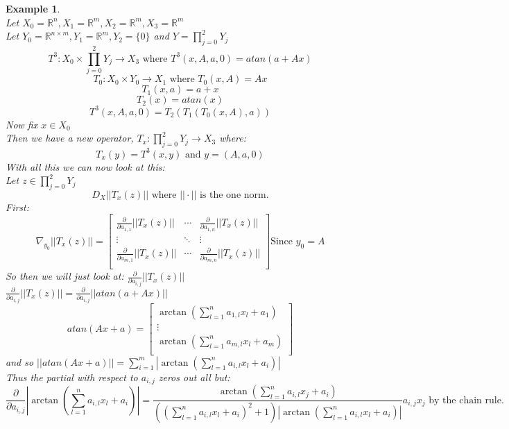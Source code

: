 \documentclass[12pt]{extarticle}
\theoremstyle{plain}
\theoremstyle{Definition}
\theoremstyle{Definition}
\theoremstyle{plain}
\newtheorem{exmp}{Example}[section]
\begin{document}
\begin{exmp} \textbf{} \\
Let $X_0 = \mathbb{R}^n, X_1 = \mathbb{R}^m, X_2 = \mathbb{R}^m, X_3 = \mathbb{R}^m$ \\
Let $Y_0 = \mathbb{R}^{n\times m}, Y_1 = \mathbb{R}^m, Y_2 = \{0\}$ and $Y = \prod_{j=0}^{2} Y_j$ 
$$T^3 : X_0 \times \prod_{j=0}^{2} Y_j \to X_3  \text{ where } T^3(x,A,a,0) = atan(a + Ax)$$ 
$$T_0 : X_0 \times Y_0 \to X_1 \text{ where } T_0(x,A) = Ax$$ 
$$T_1(x,a) = a+x$$ 
$$T_2(x) = atan(x)$$ 
$$T^3(x,A,a,0) = T_2(T_1(T_0(x,A),a) )$$ 
Now fix $x \in X_0$ \\ 
Then we have a new operator, $T_x : \prod_{j=0}^{2} Y_j \to X_3$ where: \\ 
$$T_x(y) = T^3(x,y) \text{ and } y = (A,a,0)$$
With all this we can now look at this: \\ 
Let $z \in \prod_{j=0}^{2} Y_j$ 
$$D_X ||T_x(z)|| \text{ where } ||\cdot|| \text{ is the one norm.}$$
First: \\ 
\[
\nabla_{y_0} ||T_x(z)|| = 
\begin{bmatrix}
\frac{\partial}{\partial a_{1,1}} ||T_x(z)|| & \cdots & \frac{\partial}{\partial a_{1,n}} ||T_x(z)|| \\
\vdots & \ddots & \vdots \\ 
\frac{\partial}{\partial a_{m,1}} ||T_x(z)|| & \cdots & \frac{\partial}{\partial a_{m,n}} ||T_x(z)|| \\
\end{bmatrix}
\text{Since } y_0 = A
\]
So then we will just look at: $\frac{\partial}{\partial a_{i,j}} ||T_x(z)||$ \\ 
$\frac{\partial}{\partial a_{i,j}} ||T_x(z)|| = \frac{\partial}{\partial a_{i,j}} ||atan(a + Ax)||$ \\
\[
atan(Ax +a) = 
\begin{bmatrix}
\arctan(\sum_{l=1}^n a_{1,l}x_l + a_1)\\ 
\vdots \\ 
\arctan(\sum_{l=1}^n a_{m,l}x_l + a_m)\\ 
\end{bmatrix}
\]
and so $||atan(Ax +a)|| = \sum_{i=1}^m | \arctan(\sum_{l=1}^n a_{i,l}x_l + a_i)|$ \\
Thus the partial with respect to $a_{i,j}$ zeros out all but: \\
$$\frac{\partial}{\partial a_{i,j}}| \arctan(\sum_{l=1}^n a_{i,l}x_l + a_i)| = \frac{\arctan(\sum_{l=1}^n a_{i,l}x_j + a_i)}{((\sum_{l=1}^n a_{i,l}x_l + a_i)^2 + 1  )|\arctan(\sum_{l=1}^n a_{i,l}x_l + a_i)|}a_{i,j}x_j \text{ by the chain rule. }$$
\end{exmp}
\end{document}
